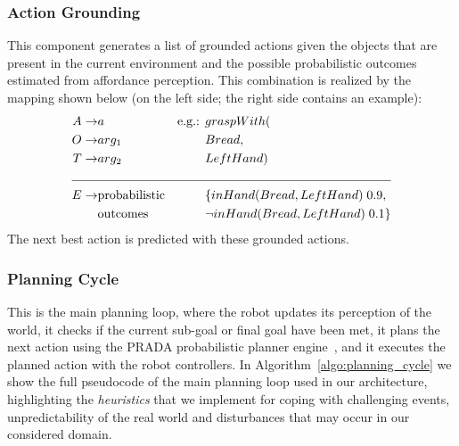 \subsubsection{Action Grounding}
\label{sec:poeticon++:proposed_approach:action_grounding}

This component generates a list of grounded actions given the objects that are present in the current environment and the possible probabilistic outcomes estimated from affordance perception.
This combination is realized by the mapping shown below (on the left side; the right side contains an example):
\begin{align*}
A \to &a                    & \text{e.g.: } & graspWith( \\
O \to &arg_1                &               & Bread, \\
T \to &arg_2                &               & LeftHand) \\
\cline{1-4} %
E \to &\text{probabilistic} &               & \{ inHand(Bread,LeftHand) \; 0.9, \\
      &\text{outcomes}      &               & \neg inHand(Bread,LeftHand) \; 0.1 \}
\end{align*}
The next best action is predicted with these grounded actions.

\subsubsection{Planning Cycle}
\label{sec:poeticon++:proposed_approach:planning_cycle}

This is the main planning loop, where the robot updates its perception of the world, it checks if the current sub-goal or final goal have been met, it plans the next action using the PRADA probabilistic planner engine~\cite{lang:2010:prada}, and it executes the planned action with the robot controllers.
In Algorithm~\ref{algo:planning_cycle} we show the full pseudocode of the main planning loop used in our architecture, highlighting the \emph{heuristics} that we implement for coping with challenging events, unpredictability of the real world and disturbances that may occur in our considered domain.

